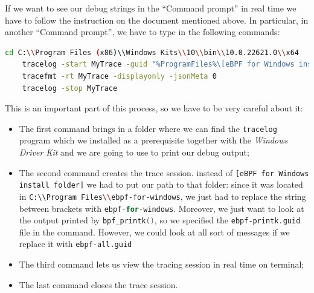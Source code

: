 If we want to see our debug strings in the ``Command prompt'' in real time we have to follow the instruction on the document mentioned above.
In particular, in another ``Command prompt'', we have to type in the following commands:

\begin{lstlisting}[style=commandline, language=bash, caption={tracelog real time debugging command}]
	cd C:\\Program Files (x86)\\Windows Kits\\10\\bin\\10.0.22621.0\\x64
	tracelog -start MyTrace -guid "%ProgramFiles%\[eBPF for Windows install folder]\ebpf-printk.guid" -rt 
	tracefmt -rt MyTrace -displayonly -jsonMeta 0
	tracelog -stop MyTrace
\end{lstlisting}

This is an important part of this process, so we have to be very careful about it:

\begin{itemize}
	\item 
		The first command brings in a folder where we can find the \colorbox{backcolour}{\lstinline[style=commandline, language=bash]|tracelog|} program which we installed as a prerequisite together with the \textit{Windows Driver Kit} and we are going to use to print our debug output;
	\item 
		The second command creates the trace session.
		instead of \colorbox{backcolour}{\lstinline[style=commandline, language=bash]|[eBPF for Windows install folder]|} we had to put our path to that folder: since it was located in \colorbox{backcolour}{\lstinline[style=commandline, language=bash]|C:\\Program Files\\ebpf-for-windows|}, we just had to replace the string between brackets with \colorbox{backcolour}{\lstinline[style=cstyle, language=C]|ebpf-for-windows|}.
		Moreover, we just want to look at the output printed by \colorbox{backcolour}{\lstinline[style=cstyle, language=C]|bpf_printk()|}, so we specified the \colorbox{backcolour}{\lstinline[style=commandline, language=bash]|ebpf-printk.guid|} file in the command.
		However, we could look at all sort of messages if we replace it with \colorbox{backcolour}{\lstinline[style=commandline, language=bash]|ebpf-all.guid|}
	\item 
		The third command lets us view the tracing session in real time on terminal;
	\item 
		The last command closes the trace session.
\end{itemize}

